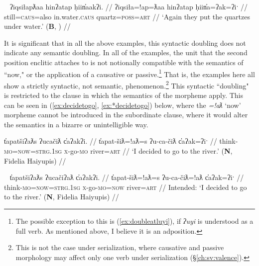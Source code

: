 
\begin{comment}
\ex~ \label{ex:doubleatgeneric}
\begingl
\glpreamble ʔayaqḥʔatna huḥtak̓at. //
\gla ʔaya-(q)ḥ=!at=naˑ huḥtak=!at  //
\glb many-\textsc{link}=\textsc{pass}=\textsc{neut.1pl} learn=\textsc{pass} //
\glft `Many know.' (\textbf{B}, Sarah Webster) //
\endgl
\xe
\end{comment}


\ex~ \label{ex:doubleap}
\begingl
\glpreamble ʔiqsiłapƛaa hinʔatap ḥiin̓aakʔi.\footnotemark{} //
\gla ʔiqsiła=!ap=ƛaa hinʔatap ḥiin̓a=ʔak=ʔiˑ  //
\glb still=\textsc{caus}=also in.water.\textsc{caus} quartz=\textsc{poss}=\textsc{art} //
\glft `Again they put the quartzes under water.' (\textbf{B}, \citealt[60]{sapir1955}) //
\endgl
\xe


It is significant that in all the above examples, this syntactic doubling does not indicate any semantic doubling. In all of the examples, the unit that the second position enclitic attaches to is not notionally compatible with the semantics of ``now," or the application of a causative or passive.\footnote{The possible exception to this is (\ref{ex:doubleatluyi}), if \textit{ʔuyi} is understood as a full verb. As mentioned above, I believe it is an adposition.} That is, the examples here all show a strictly syntactic, not semantic, phenomenon.\footnote{This is not the case under serialization, where causative and passive morphology may affect only one verb under serialization (\S\ref{ch:sv:valence}).} This syntactic ``doubling" is restricted to the clause in which the semantics of the morpheme apply. This can be seen in (\ref{ex:decidetogo}, \ref{ex:*decidetogo}) below, where the \textit{=!aƛ} `now' morpheme cannot be introduced in the subordinate clause, where it would alter the semantics in a bizarre or unintelligible way.

\ex \label{ex:decidetogo}
\begingl
\glpreamble t̓apatšiʔaƛs ʔucačiƛ c̓aʔakʔi. //
\gla t̓apat-šiƛ=!aƛ=s ʔu-ca-čiƛ c̓aʔak=ʔiˑ //
\glb think-\textsc{mo}=\textsc{now}=\textsc{strg.1sg} \textsc{x}-go-\textsc{mo} river=\textsc{art} //
\glft `I decided to go to the river.' (\textbf{N}, Fidelia Haiyupis) //
\endgl
\xe

\ex~ \label{ex:*decidetogo}
\begingl
\glpreamble *t̓apatšiʔaƛs ʔucačiʔaƛ c̓aʔakʔi. //
\gla *t̓apat-šiƛ=!aƛ=s ʔu-ca-čiƛ=!aƛ c̓aʔak=ʔiˑ //
\glb think-\textsc{mo}=\textsc{now}=\textsc{strg.1sg} \textsc{x}-go-\textsc{mo}=\textsc{now} river=\textsc{art} //
\glft Intended: `I decided to go to the river.' (\textbf{N}, Fidelia Haiyupis) //
\endgl
\xe

